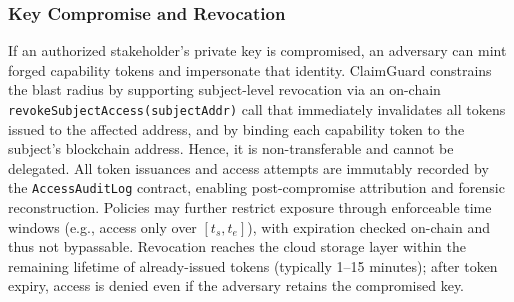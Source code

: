 \documentclass[final,5p,times,twocolumn]{elsarticle}
\begin{document}

\subsubsection{Key Compromise and Revocation}
If an authorized stakeholder’s private key is compromised, an adversary can mint forged capability tokens and impersonate that identity. ClaimGuard constrains the blast radius by supporting subject-level revocation via an on-chain \texttt{revokeSubjectAccess(subjectAddr)} call that immediately invalidates all tokens issued to the affected address, and by binding each capability token to the subject’s blockchain address. Hence, it is non-transferable and cannot be delegated. All token issuances and access attempts are immutably recorded by the \texttt{AccessAuditLog} contract, enabling post-compromise attribution and forensic reconstruction. Policies may further restrict exposure through enforceable time windows (e.g., access only over $[t_s,t_e]$), with expiration checked on-chain and thus not bypassable. Revocation reaches the cloud storage layer within the remaining lifetime of already-issued tokens (typically 1--15 minutes); after token expiry, access is denied even if the adversary retains the compromised key.



\end{document}
